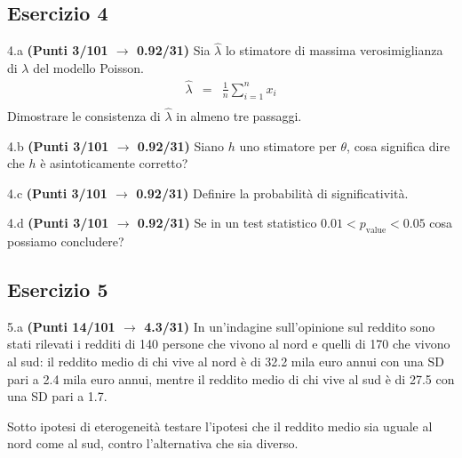 \documentclass[
  11pt,
]{book}
\theoremstyle{mytheoremstyle}
\theoremstyle{mydefstyle}
\begin{document}
\subsection{Esercizio 4}\label{esercizio-4-11}

4.a \textbf{(Punti 3/101 \(\rightarrow\) 0.92/31)} Sia \(\hat \lambda\) lo stimatore di massima verosimiglianza di \(\lambda\) del modello Poisson.
\begin{eqnarray*}
  \hat\lambda &=&  \frac 1n\sum_{i=1}^nx_i\\
\end{eqnarray*}
Dimostrare le consistenza di \(\hat\lambda\) in almeno tre passaggi.

4.b \textbf{(Punti 3/101 \(\rightarrow\) 0.92/31)} Siano \(h\) uno stimatore per \(\theta\), cosa significa dire che \(h\) è asintoticamente corretto?

4.c \textbf{(Punti 3/101 \(\rightarrow\) 0.92/31)} Definire la probabilità di significatività.

4.d \textbf{(Punti 3/101 \(\rightarrow\) 0.92/31)} Se in un test statistico \(0.01 < p_\text{value} <0.05\) cosa possiamo concludere?

\subsection{Esercizio 5}\label{esercizio-5-10}

5.a \textbf{(Punti 14/101 \(\rightarrow\) 4.3/31)} In un'indagine sull'opinione sul reddito sono stati rilevati i redditi di 140 persone che vivono al nord e quelli di 170 che vivono al sud: il reddito medio di chi vive al nord è di 32.2 mila euro annui con una SD pari a 2.4 mila euro annui, mentre il
reddito medio di chi vive al sud è di 27.5 con una SD pari a 1.7.

Sotto ipotesi di eterogeneità testare l'ipotesi che il reddito medio sia uguale al nord come al sud, contro l'alternativa che sia diverso.
\end{document}
